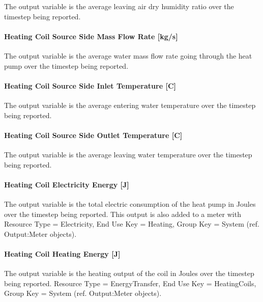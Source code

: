 The output variable is the average leaving air dry humidity ratio over the timestep being reported.

\paragraph{Heating Coil Source Side Mass Flow Rate {[}kg/s{]}}\label{heating-coil-source-side-mass-flow-rate-kgs}

The output variable is the average water mass flow rate going through the heat pump over the timestep being reported.

\paragraph{Heating Coil Source Side Inlet Temperature {[}C{]}}\label{heating-coil-source-side-inlet-temperature-c}

The output variable is the average entering water temperature over the timestep being reported.

\paragraph{Heating Coil Source Side Outlet Temperature {[}C{]}}\label{heating-coil-source-side-outlet-temperature-c}

The output variable is the average leaving water temperature over the timestep being reported.

\paragraph{Heating Coil Electricity Energy {[}J{]}}\label{heating-coil-electric-energy-j-5}

The output variable is the total electric consumption of the heat pump in Joules over the timestep being reported. This output is also added to a meter with Resource Type = Electricity, End Use Key = Heating, Group Key = System (ref. Output:Meter objects).

\paragraph{Heating Coil Heating Energy {[}J{]}}\label{heating-coil-heating-energy-j-10}

The output variable is the heating output of the coil in Joules over the timestep being reported. Resource Type = EnergyTransfer, End Use Key = HeatingCoils, Group Key = System (ref. Output:Meter objects).

